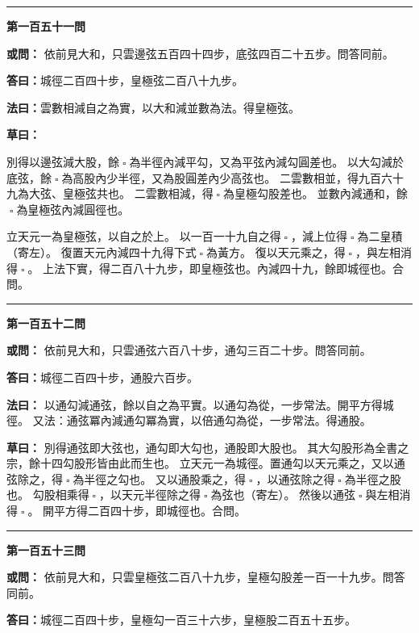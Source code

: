 \documentclass[11pt,a4paper]{article}
\let\origsquare\square
\renewcommand{\square}{\ensuremath{\origsquare}}%
\newcommand{\longline}{\noindent\rule{\textwidth}{0.4pt}}
\newcommand{\owen}[1]{%
  \par\vspace{0.4em}%
  \noindent\textcolor{problemcolor}{\textbf{或問：}}{\tradfont #1}\par\nopagebreak%
}
\newcommand{\fayue}[1]{%
  \par\noindent\textcolor{methodcolor}{\textbf{法曰：}}{\tradfont #1}\par\nopagebreak%
}
\newcommand{\tsaoyue}[1]{%
  \par\noindent\textcolor{workcolor}{\textbf{草曰：}}{\tradfont #1}\par%
}
\newcommand{\dayue}[1]{%
  \par\noindent\textcolor{anscolor}{\textbf{答曰：}}{\tradfont #1}\par\nopagebreak%
}
\newcommand{\wen}[1]{\par\vspace{0.3em}\noindent\textcolor{problemcolor}{\textbf{第#1問}}\par}
\begin{document}
\vspace{0.5cm}
\begin{center}
\longline
\end{center}

\wen{一百五十一}
\owen{%
依前見大和，只雲邊弦五百四十四步，底弦四百二十五步。問答同前。}
\dayue{城徑二百四十步，皇極弦二百八十九步。}

\fayue{雲數相減自之為實，以大和減並數為法。得皇極弦。}

\tsaoyue{%
別得以邊弦減大股，餘$ \; \square \; $為半徑內減平勾，又為平弦內減勾圓差也。
以大勾減於底弦，餘$ \; \square \; $為高股內少半徑，又為股圓差內少高弦也。
二雲數相並，得九百六十九為大弦、皇極弦共也。
二雲數相減，得$ \; \square \; $為皇極勾股差也。
並數內減通和，餘$ \; \square \; $為皇極弦內減圓徑也。

立天元一為皇極弦，以自之於上。
以一百一十九自之得$ \; \square \; $，減上位得$ \; \square \; $為二皇積（寄左）。
復置天元內減四十九得下式$ \; \square \; $為黃方。
復以天元乘之，得$ \; \square \; $，與左相消得$ \; \square \; $。
上法下實，得二百八十九步，即皇極弦也。內減四十九，餘即城徑也。合問。}

\vspace{0.5cm}
\begin{center}
\longline
\end{center}

\wen{一百五十二}
\owen{%
依前見大和，只雲通弦六百八十步，通勾三百二十步。問答同前。}
\dayue{城徑二百四十步，通股六百步。}

\fayue{%
以通勾減通弦，餘以自之為平實。以通勾為從，一步常法。開平方得城徑。
又法：通弦冪內減通勾冪為實，以倍通勾為從，一步常法。得通股。}

\tsaoyue{%
別得通弦即大弦也，通勾即大勾也，通股即大股也。
其大勾股形為全書之宗，餘十四勾股形皆由此而生也。
立天元一為城徑。置通勾以天元乘之，又以通弦除之，得$ \; \square \; $為半徑之勾也。
又以通股乘之，得$ \; \square \; $，以通弦除之得$ \; \square \; $為半徑之股也。
勾股相乘得$ \; \square \; $，以天元半徑除之得$ \; \square \; $為弦也（寄左）。
然後以通弦$ \; \square \; $與左相消得$ \; \square \; $。
開平方得二百四十步，即城徑也。合問。}

\vspace{0.5cm}
\begin{center}
\longline
\end{center}

\wen{一百五十三}
\owen{%
依前見大和，只雲皇極弦二百八十九步，皇極勾股差一百一十九步。問答同前。}
\dayue{城徑二百四十步，皇極勾一百三十六步，皇極股二百五十五步。}
\end{document}
